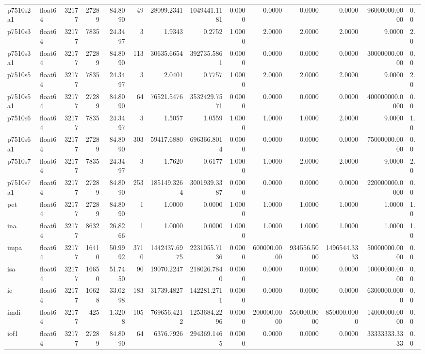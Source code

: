 \begin{longtable}{llrrrrrrrrrrrl}
p7510s2a1 & float64 & 32177 & 27289 & 84.8090 & 49 & 28099.2341 & 1049441.1181 & 0.0000 & 0.0000 & 0.0000 & 0.0000 & 96000000.0000 & 0.0 \\
p7510s3 & float64 & 32177 & 7835 & 24.3497 & 3 & 1.9343 & 0.2752 & 1.0000 & 2.0000 & 2.0000 & 2.0000 & 9.0000 & 2.0 \\
p7510s3a1 & float64 & 32177 & 27289 & 84.8090 & 113 & 30635.6654 & 392735.5861 & 0.0000 & 0.0000 & 0.0000 & 0.0000 & 30000000.0000 & 0.0 \\
p7510s5 & float64 & 32177 & 7835 & 24.3497 & 3 & 2.0401 & 0.7757 & 1.0000 & 2.0000 & 2.0000 & 2.0000 & 9.0000 & 2.0 \\
p7510s5a1 & float64 & 32177 & 27289 & 84.8090 & 64 & 76521.5476 & 3532429.7571 & 0.0000 & 0.0000 & 0.0000 & 0.0000 & 400000000.0000 & 0.0 \\
p7510s6 & float64 & 32177 & 7835 & 24.3497 & 3 & 1.5057 & 1.0559 & 1.0000 & 1.0000 & 1.0000 & 2.0000 & 9.0000 & 1.0 \\
p7510s6a1 & float64 & 32177 & 27289 & 84.8090 & 303 & 59417.6880 & 696366.8014 & 0.0000 & 0.0000 & 0.0000 & 0.0000 & 75000000.0000 & 0.0 \\
p7510s7 & float64 & 32177 & 7835 & 24.3497 & 3 & 1.7620 & 0.6177 & 1.0000 & 1.0000 & 2.0000 & 2.0000 & 9.0000 & 2.0 \\
p7510s7a1 & float64 & 32177 & 27289 & 84.8090 & 253 & 185149.3264 & 3001939.3387 & 0.0000 & 0.0000 & 0.0000 & 0.0000 & 220000000.0000 & 0.0 \\
pet & float64 & 32177 & 27289 & 84.8090 & 1 & 1.0000 & 0.0000 & 1.0000 & 1.0000 & 1.0000 & 1.0000 & 1.0000 & 1.0 \\
ina & float64 & 32177 & 8632 & 26.8266 & 1 & 1.0000 & 0.0000 & 1.0000 & 1.0000 & 1.0000 & 1.0000 & 1.0000 & 1.0 \\
impa & float64 & 32177 & 16410 & 50.9992 & 3710 & 1442437.6975 & 2231055.7136 & 0.0000 & 600000.0000 & 934556.5000 & 1496544.3333 & 50000000.0000 & 0.0 \\
isa & float64 & 32177 & 16650 & 51.7450 & 90 & 19070.2247 & 218026.7840 & 0.0000 & 0.0000 & 0.0000 & 0.0000 & 10000000.0000 & 0.0 \\
ie & float64 & 32177 & 10628 & 33.0298 & 183 & 31739.4827 & 142281.2711 & 0.0000 & 0.0000 & 0.0000 & 0.0000 & 6300000.0000 & 0.0 \\
imdi & float64 & 32177 & 425 & 1.3208 & 105 & 769656.4212 & 1253684.2296 & 0.0000 & 200000.0000 & 550000.0000 & 850000.0000 & 14000000.0000 & 0.0 \\
iof1 & float64 & 32177 & 27289 & 84.8090 & 64 & 6376.7926 & 294369.1465 & 0.0000 & 0.0000 & 0.0000 & 0.0000 & 33333333.3333 & 0.0 \\

\end{longtable}
